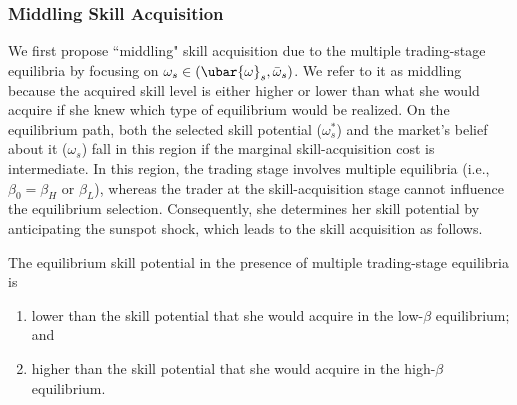 \subsubsection{Middling Skill Acquisition}
We first propose ``middling" skill acquisition due to the multiple trading-stage equilibria by focusing on $\omega_{s}\in (\ubar{\omega}_{s},\bar{\omega}_{s})$. We refer to it as middling because the acquired skill level is either higher or lower than what she would acquire if she knew which type of equilibrium would be realized. On the equilibrium path, both the selected skill potential ($\omega_{s}^{*}$) and the market's belief about it ($\omega_{s}$) fall in this region if the marginal skill-acquisition cost is intermediate. In this region, the trading stage involves multiple equilibria (i.e., $\beta_{0} = \beta_{H}$ or $\beta_{L}$), whereas the trader at the skill-acquisition stage cannot influence the equilibrium selection.
Consequently, she determines her skill potential by anticipating the sunspot shock, which leads to the skill acquisition as follows. 


\begin{proposition}\label{prop:skill_inef}
The equilibrium skill potential in the presence of multiple trading-stage equilibria is
\begin{enumerate}[label=(\roman*)]
\item lower than the skill potential that she would acquire in the low-$\beta$ equilibrium; and 
\item higher than the skill potential that she would acquire in the high-$\beta$ equilibrium.
\end{enumerate}
\end{proposition}

